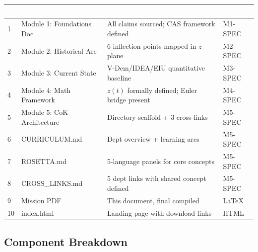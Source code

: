 \documentclass[11pt,letterpaper]{article}
\newcommand{\tableheader}[1]{\textbf{\sffamily\textcolor{white}{#1}}}
\begin{document}
\begin{center}
\begin{tabularx}{\textwidth}{C{0.5cm}L{4cm}L{4cm}L{3cm}}
\toprule
{}
\tableheader{\#} & \tableheader{Deliverable} & \tableheader{Acceptance Criteria} & \tableheader{Spec} \\
 & Module 1: Foundations Doc & All claims sourced; CAS framework defined & M1-SPEC \\
2 & Module 2: Historical Arc & 6 inflection points mapped in $z$-plane & M2-SPEC \\
3 & Module 3: Current State & V-Dem/IDEA/EIU quantitative baseline & M3-SPEC \\
4 & Module 4: Math Framework & $z(t)$ formally defined; Euler bridge present & M4-SPEC \\
5 & Module 5: CoK Architecture & Directory scaffold + 3 cross-links & M5-SPEC \\
6 & CURRICULUM.md & Dept overview + learning arcs & M5-SPEC \\
7 & ROSETTA.md & 5-language panels for core concepts & M5-SPEC \\
8 & CROSS\_LINKS.md & 5 dept links with shared concept defined & M5-SPEC \\
9 & Mission PDF & This document, final compiled & LaTeX \\
10 & index.html & Landing page with download links & HTML \\
\bottomrule
\end{tabularx}
\end{center}

\subsection{Component Breakdown}
\end{document}
